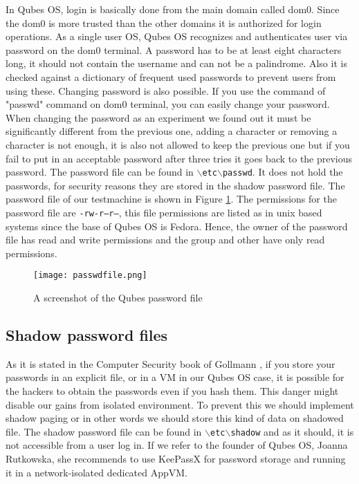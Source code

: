 \documentclass[runningheads,a4paper]{article}
\begin{document}
In Qubes OS, login is basically done
from the main domain called dom0.  Since the dom0 is more trusted than
the other domains it is authorized for login operations.  As a single
user OS, Qubes OS recognizes and authenticates user via password on
the dom0 terminal. A password has to be at least eight characters long, it should not contain the username and can not be a palindrome. Also it is checked against a dictionary of frequent used passwords to prevent users from using these. Changing password is also possible.  If you use
the command of "passwd" command on dom0 terminal, you can easily
change your password.  When changing the password as an experiment we found out it must be significantly different from the previous one, adding a character or removing a character is not enough, it is also not allowed to keep the previous one but if you fail to put in an acceptable password after three tries it goes back to the previous password. The password file can be found in \texttt{$\backslash$etc$\backslash$passwd}. 
It does not hold the passwords, for security reasons they are stored in the shadow password file. The password file of our testmachine is shown in Figure \ref{fig:passwdfile}. The permissions for the password file are \texttt{-rw-r--r--}, this file permissions are listed as in unix based systems since the base of Qubes OS is Fedora. Hence, the owner of the password file has read and write permissions and the group and other have only read permissions.

\begin{figure}[h]
  \centering
  \texttt{[image: passwdfile.png]}
  \caption{A screenshot of the Qubes password file}
  \label{fig:passwdfile}
\end{figure}

\subsection{Shadow password files} 
As it is stated in the Computer Security book of Gollmann
\cite{GollmannComputerSecurity}, if you store your passwords in an
explicit file, or in a VM in our Qubes OS case, it is possible for the
hackers to obtain the passwords even if you hash them.  
This danger might disable our gains from
isolated environment. To prevent this we should implement shadow
paging or in other words we should store this kind of data on shadowed file. The shadow password file can be found in \texttt{$\backslash$etc$\backslash$shadow} and as it should, it is not accessible from a user log in. If we refer to the founder of Qubes OS, Joanna Rutkowska, she
recommends to use KeePassX for password storage and running it in a network-isolated
dedicated AppVM.  
\end{document}
